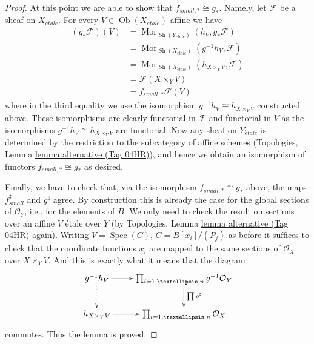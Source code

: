 \documentclass{amsart}
\theoremstyle{plain}
\theoremstyle{definition}
\theoremstyle{remark}
\numberwithin{equation}{subsection}
\def\Spec{\mathop{\mathrm{Spec}}}
\def\Mor{\mathop{\mathrm{Mor}}\nolimits}
\def\Ob{\mathop{\mathrm{Ob}}\nolimits}
\def\Sh{\mathop{\mathit{Sh}}\nolimits}
\def\etale{{\acute{e}tale}}
\begin{document}
\begin{proof}
\medskip\noindent
At this point we are able to show that $f_{small, *} \cong g_*$.
Namely, let $\mathcal{F}$ be a sheaf on $X_\etale$. For every
$V \in \Ob(X_\etale)$ affine we have
\begin{align*}
(g_*\mathcal{F})(V)
& =
\Mor_{\Sh(Y_\etale)}(h_V, g_*\mathcal{F}) \\
& =
\Mor_{\Sh(X_\etale)}(g^{-1}h_V, \mathcal{F}) \\
& =
\Mor_{\Sh(X_\etale)}(h_{X \times_Y V}, \mathcal{F}) \\
& =
\mathcal{F}(X \times_Y V) \\
& =
f_{small, *}\mathcal{F}(V)
\end{align*}
where in the third equality we use the isomorphism
$g^{-1}h_V \cong h_{X \times_Y V}$ constructed above. These isomorphisms
are clearly functorial in $\mathcal{F}$ and functorial in $V$
as the isomorphisms $g^{-1}h_V \cong h_{X \times_Y V}$ are functorial.
Now any sheaf on $Y_\etale$ is determined by the restriction
to the subcategory of affine schemes
(Topologies, Lemma \href{https://stacks.math.columbia.edu/tag/04HR}{lemma alternative (Tag 04HR)}),
and hence we obtain an isomorphism of functors $f_{small, *} \cong g_*$
as desired.

\medskip\noindent
Finally, we have to check that, via the isomorphism
$f_{small, *} \cong g_*$ above, the maps $f_{small}^\sharp$ and
$g^\sharp$ agree. By construction this is already the case for the
global sections of $\mathcal{O}_Y$, i.e., for the elements of $B$.
We only need to check the result on
sections over an affine $V$ \'etale over $Y$ (by
Topologies, Lemma \href{https://stacks.math.columbia.edu/tag/04HR}{lemma alternative (Tag 04HR)}
again). Writing
$V = \Spec(C)$, $C = B[x_i]/(P_j)$ as before it suffices
to check that the coordinate functions $x_i$ are mapped to
the same sections of $\mathcal{O}_X$ over $X \times_Y V$.
And this is exactly what it means that the diagram
$$
\xymatrix{
g^{-1}h_V \ar[r] \ar@{..>}[d] &
\prod\nolimits_{i = 1, \ldots, n} g^{-1}\mathcal{O}_Y
\ar[d]^{\prod g^\sharp} \\
h_{X \times_Y V} \ar[r] &
\prod\nolimits_{i = 1, \ldots, n} \mathcal{O}_X
}
$$
commutes. Thus the lemma is proved.
\end{proof}
\end{document}

